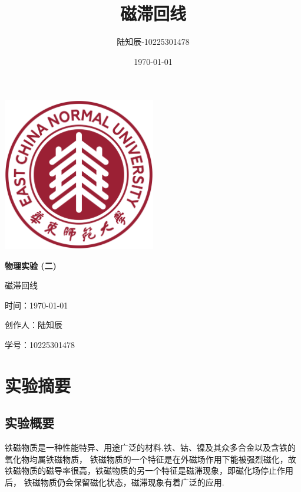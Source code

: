 \documentclass{ctexart}
\title{磁滞回线}
\author{陆知辰-10225301478}
\date{\today}
\begin{document}
\begin{titlepage}
  \centering
  \includegraphics[width=0.5\textwidth]{ecnu.png}
  
  \vspace*{\baselineskip}
  
  \Huge\textbf{物\quad 理\quad 实\quad 验 \quad (二)}
  \vspace*{0.3\baselineskip}
  
  \huge 磁滞回线
  
  \vspace*{2\baselineskip}
  
  \large 时间：\today
  
  \vspace*{\baselineskip}
  
  \large 创作人：陆知辰
  
  \vspace*{\baselineskip}
  
  \large 学号：10225301478
  
\end{titlepage}
\newpage
\tableofcontents
\newpage
\section{实验摘要}
  \subsection{实验概要}
  铁磁物质是一种性能特异、用途广泛的材料.铁、钴、镍及其众多合金以及含铁的氧化物均属铁磁物质，
  铁磁物质的一个特征是在外磁场作用下能被强烈磁化，故铁磁物质的磁导率很高，铁磁物质的另一个特征是磁滞现象，即磁化场停止作用后，
  铁磁物质仍会保留磁化状态，磁滞现象有着广泛的应用.
\end{document}
